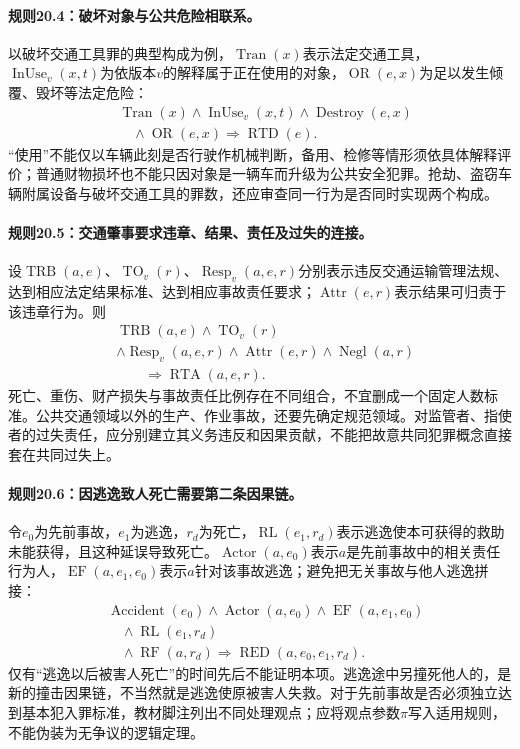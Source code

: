 \paragraph{规则20.4：破坏对象与公共危险相联系。}
以破坏交通工具罪的典型构成为例，$\operatorname{Tran}(x)$表示法定交通工具，$\operatorname{InUse}_v(x,t)$为依版本$v$的解释属于正在使用的对象，$\operatorname{OR}(e,x)$为足以发生倾覆、毁坏等法定危险：
\[
\begin{aligned}
&\operatorname{Tran}(x)\land\operatorname{InUse}_v(x,t)
\land\operatorname{Destroy}(e,x)\\
&\quad\land\operatorname{OR}(e,x)
\Rightarrow\operatorname{RTD}(e).
\end{aligned}
\]
“使用”不能仅以车辆此刻是否行驶作机械判断，备用、检修等情形须依具体解释评价；普通财物损坏也不能只因对象是一辆车而升级为公共安全犯罪。抢劫、盗窃车辆附属设备与破坏交通工具的罪数，还应审查同一行为是否同时实现两个构成。

\paragraph{规则20.5：交通肇事要求违章、结果、责任及过失的连接。}
设$\operatorname{TRB}(a,e)$、$\operatorname{TO}_v(r)$、$\operatorname{Resp}_v(a,e,r)$分别表示违反交通运输管理法规、达到相应法定结果标准、达到相应事故责任要求；$\operatorname{Attr}(e,r)$表示结果可归责于该违章行为。则
\[
\begin{aligned}
&\operatorname{TRB}(a,e)\land\operatorname{TO}_v(r)\\
&\land\operatorname{Resp}_v(a,e,r)\land\operatorname{Attr}(e,r)
\land\operatorname{Negl}(a,r)\\
&\qquad\Rightarrow\operatorname{RTA}(a,e,r).
\end{aligned}
\]
死亡、重伤、财产损失与事故责任比例存在不同组合，不宜删成一个固定人数标准。公共交通领域以外的生产、作业事故，还要先确定规范领域。对监管者、指使者的过失责任，应分别建立其义务违反和因果贡献，不能把故意共同犯罪概念直接套在共同过失上。

\paragraph{规则20.6：因逃逸致人死亡需要第二条因果链。}
令$e_0$为先前事故，$e_1$为逃逸，$r_d$为死亡，$\operatorname{RL}(e_1,r_d)$表示逃逸使本可获得的救助未能获得，且这种延误导致死亡。$\operatorname{Actor}(a,e_0)$表示$a$是先前事故中的相关责任行为人，$\operatorname{EF}(a,e_1,e_0)$表示$a$针对该事故逃逸；避免把无关事故与他人逃逸拼接：
\[
\begin{aligned}
&\operatorname{Accident}(e_0)\land\operatorname{Actor}(a,e_0)
\land\operatorname{EF}(a,e_1,e_0)\\
&\quad\land\operatorname{RL}(e_1,r_d)\\
&\quad\land\operatorname{RF}(a,r_d)
\Rightarrow\operatorname{RED}(a,e_0,e_1,r_d).
\end{aligned}
\]
仅有“逃逸以后被害人死亡”的时间先后不能证明本项。逃逸途中另撞死他人的，是新的撞击因果链，不当然就是逃逸使原被害人失救。对于先前事故是否必须独立达到基本犯入罪标准，教材脚注列出不同处理观点；应将观点参数$\pi$写入适用规则，不能伪装为无争议的逻辑定理。

